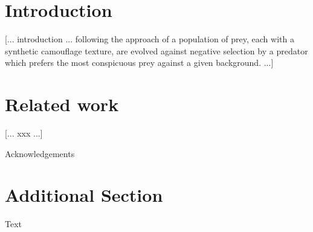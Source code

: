 \documentclass[sigconf]{acmart}
\begin{document}
\maketitle


\section{Introduction}
[... introduction ... following the approach of \citet{Reynolds2011} a population of prey, each with a synthetic camouflage texture, are evolved against negative selection by a predator which prefers the most conspicuous prey against a given background. ...]

\section{Related work}
[... xxx ...]

\begin{acks}
Acknowledgements
\end{acks}


% 



\appendix

\section{Additional Section}

Text
\end{document}
